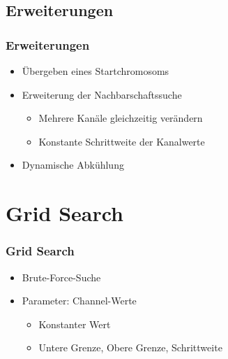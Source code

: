 
\subsection{Erweiterungen}

\begin{frame}
\frametitle{Erweiterungen}
    \begin{itemize}
        \item Übergeben eines Startchromosoms
        \item Erweiterung der Nachbarschaftssuche
            \begin{itemize}
                \item Mehrere Kanäle gleichzeitig verändern
                \item Konstante Schrittweite der Kanalwerte
            \end{itemize}
        \item Dynamische Abkühlung
    \end{itemize}
\end{frame}

\section{Grid Search}

\begin{frame}
\frametitle{Grid Search}
    \begin{itemize}
        \item Brute-Force-Suche
        \item Parameter: Channel-Werte
        \begin{itemize}
            \item Konstanter Wert
            \item Untere Grenze, Obere Grenze, Schrittweite
        \end{itemize}
    \end{itemize}
\end{frame}

